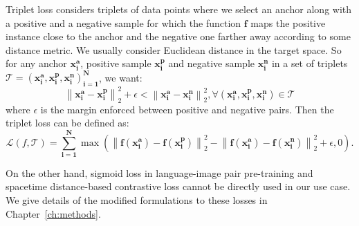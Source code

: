 Triplet loss considers triplets of data points where we select an anchor along with a positive and a negative sample for which the function $\mathbf{f}$ maps the positive instance close to the anchor and the negative one farther away according to some distance metric. We usually consider Euclidean distance in the target space. So for any anchor $\mathbf{x^a_i}$, positive sample $\mathbf{x^p_i}$ and negative sample $\mathbf{x^n_i}$ in a set of triplets $\mathcal{T} = \mathbf{\left(x_{i}^{a}, x_{i}^{p}, x_{i}^{n}\right)_{i=1}^N}$, we want:
\begin{equation}
    \left\|\mathbf{x_{i}^{a}-x_{i}^{p}}\right\|_{2}^{2}+\epsilon<\left\|\mathbf{x_{i}^{a}-x_{i}^{n}}\right\|_{2}^{2}, \forall\left(\mathbf{x_{i}^{a}, x_{i}^{p}, x_{i}^{n}}\right) \in \mathcal{T} 
\end{equation}
where $\epsilon$ is the margin enforced between positive and negative pairs. Then the triplet loss can be defined as:
\begin{equation}
    \mathcal{L}(f, \mathcal{T}) = \sum_{\mathbf{i=1}}^\mathbf{N} \max \left(\left\|\mathbf{f(x_{i}^{a})-f(x_{i}^{p})}\right\|_{2}^{2} - \left\|\mathbf{f(x_{i}^{a})-f(x_{i}^{n})}\right\|_{2}^{2} +\epsilon, 0\right) .
\end{equation}

On the other hand, sigmoid loss in language-image pair pre-training and spacetime distance-based contrastive loss cannot be directly used in our use case. We give details of the modified formulations to these losses in Chapter~\ref{ch:methods}.
